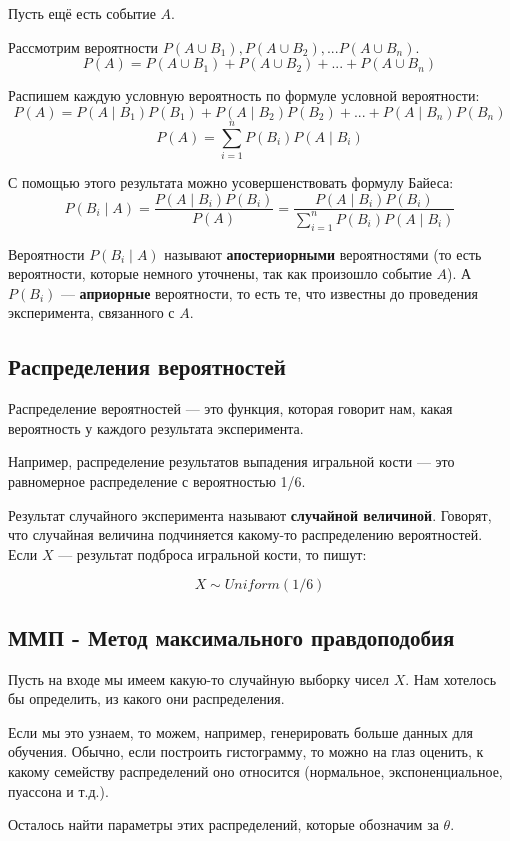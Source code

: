 Пусть ещё есть событие $A$. 

Рассмотрим вероятности $P(A \cup B_1), P(A \cup B_2), ... P(A \cup B_n)$.
$$
P(A) = P(A \cup B_1) + P(A \cup B_2)+ ... + P(A \cup B_n)
$$

Распишем каждую условную вероятность по формуле условной вероятности:
$$
P(A) = P(A \mid B_1) P(B_1) + P(A \mid B_2)P(B_2)+ ... + P(A \mid B_n) P(B_n)
$$
$$
P(A) = \sum_{i=1}^{n} P(B_i)P(A \mid B_i)
$$

С помощью этого результата можно усовершенствовать формулу Байеса:
$$
P(B_i \mid A)=\frac{P (A \mid B_i) P(B_i)}{P(A)} = \frac{P (A \mid B_i) P(B_i)}{\sum_{i=1}^{n} P(B_i)P(A \mid B_i)}
$$

Вероятности $P(B_i \mid A)$ называют \textbf{апостериорными} вероятностями (то есть вероятности, которые немного уточнены, так как произошло событие $A$). А $P(B_i)$ --- \textbf{априорные} вероятности, то есть те, что известны до проведения эксперимента, связанного с $A$.


\subsection{Распределения вероятностей}

Распределение вероятностей --- это функция, которая говорит нам, какая вероятность у каждого результата эксперимента.

Например, распределение результатов выпадения игральной кости --- это равномерное распределение с вероятностью 1/6.

Результат случайного эксперимента называют \textbf{случайной величиной}. Говорят, что случайная величина подчиняется какому-то распределению вероятностей. Если $X$ --- результат подброса игральной кости, то пишут:

$$
X \sim Uniform(1/6)
$$

\subsection{ММП - Метод максимального правдоподобия}
Пусть на входе мы имеем какую-то случайную выборку чисел $X$. Нам хотелось бы определить, из какого они распределения. 

Если мы это узнаем, то можем, например, генерировать больше данных для обучения. Обычно, если построить гистограмму, то можно на глаз оценить, к какому семейству распределений оно относится (нормальное, экспоненциальное, пуассона и т.д.). 

Осталось найти параметры этих распределений, которые обозначим за $\theta $.

